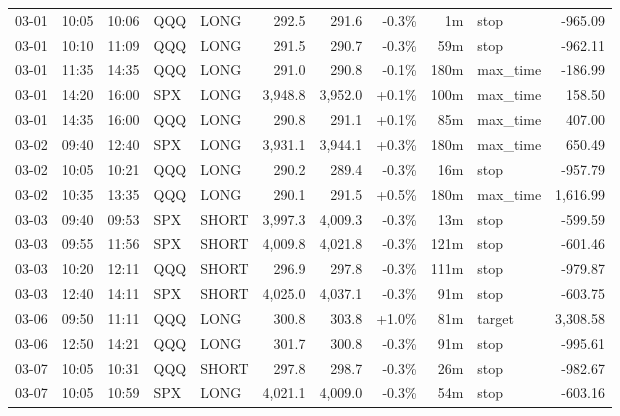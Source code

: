 \documentclass[11pt,a4paper,twoside]{article}
\begin{document}
\begin{center}
\begin{longtable}{>{\color{txtmain}}l l l l l r r r r >{\color{txtmain}}l r}
03-01 & 10:05 & 10:06 & QQQ & LONG & 292.5 & 291.6 & \textcolor{lossred}{-0.3\%} & 1m & stop & \textcolor{lossred}{-965.09} \\
03-01 & 10:10 & 11:09 & QQQ & LONG & 291.5 & 290.7 & \textcolor{lossred}{-0.3\%} & 59m & stop & \textcolor{lossred}{-962.11} \\
03-01 & 11:35 & 14:35 & QQQ & LONG & 291.0 & 290.8 & \textcolor{lossred}{-0.1\%} & 180m & max\_time & \textcolor{lossred}{-186.99} \\
03-01 & 14:20 & 16:00 & SPX & LONG & 3,948.8 & 3,952.0 & \textcolor{wingreen}{+0.1\%} & 100m & max\_time & \textcolor{wingreen}{158.50} \\
03-01 & 14:35 & 16:00 & QQQ & LONG & 290.8 & 291.1 & \textcolor{wingreen}{+0.1\%} & 85m & max\_time & \textcolor{wingreen}{407.00} \\
03-02 & 09:40 & 12:40 & SPX & LONG & 3,931.1 & 3,944.1 & \textcolor{wingreen}{+0.3\%} & 180m & max\_time & \textcolor{wingreen}{650.49} \\
03-02 & 10:05 & 10:21 & QQQ & LONG & 290.2 & 289.4 & \textcolor{lossred}{-0.3\%} & 16m & stop & \textcolor{lossred}{-957.79} \\
03-02 & 10:35 & 13:35 & QQQ & LONG & 290.1 & 291.5 & \textcolor{wingreen}{+0.5\%} & 180m & max\_time & \textcolor{wingreen}{1,616.99} \\
03-03 & 09:40 & 09:53 & SPX & SHORT & 3,997.3 & 4,009.3 & \textcolor{lossred}{-0.3\%} & 13m & stop & \textcolor{lossred}{-599.59} \\
03-03 & 09:55 & 11:56 & SPX & SHORT & 4,009.8 & 4,021.8 & \textcolor{lossred}{-0.3\%} & 121m & stop & \textcolor{lossred}{-601.46} \\
03-03 & 10:20 & 12:11 & QQQ & SHORT & 296.9 & 297.8 & \textcolor{lossred}{-0.3\%} & 111m & stop & \textcolor{lossred}{-979.87} \\
03-03 & 12:40 & 14:11 & SPX & SHORT & 4,025.0 & 4,037.1 & \textcolor{lossred}{-0.3\%} & 91m & stop & \textcolor{lossred}{-603.75} \\
03-06 & 09:50 & 11:11 & QQQ & LONG & 300.8 & 303.8 & \textcolor{wingreen}{+1.0\%} & 81m & target & \textcolor{wingreen}{3,308.58} \\
03-06 & 12:50 & 14:21 & QQQ & LONG & 301.7 & 300.8 & \textcolor{lossred}{-0.3\%} & 91m & stop & \textcolor{lossred}{-995.61} \\
03-07 & 10:05 & 10:31 & QQQ & SHORT & 297.8 & 298.7 & \textcolor{lossred}{-0.3\%} & 26m & stop & \textcolor{lossred}{-982.67} \\
03-07 & 10:05 & 10:59 & SPX & LONG & 4,021.1 & 4,009.0 & \textcolor{lossred}{-0.3\%} & 54m & stop & \textcolor{lossred}{-603.16} \\

\end{longtable}
\end{center}
\end{document}
